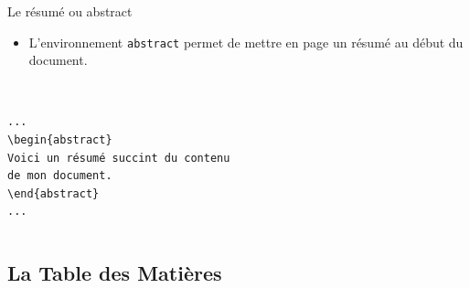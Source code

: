 \begin{frame}[fragile]{Le résumé ou abstract}
  \begin{itemize}
      \item L'environnement \lstinline|abstract| permet de mettre en page un résumé au début du document.
  \end{itemize}
  \begin{columns}
    \begin{column}{0.5\textwidth}
      \begin{lstlisting}[style=nonumbers]

...
\begin{abstract}
Voici un résumé succint du contenu
de mon document.
\end{abstract}
...

      \end{lstlisting}
    \end{column}
    \begin{column}{0.5\textwidth}
              \begin{abstract}
                  Voici un résumé succint du contenu de mon document.
              \end{abstract}
    \end{column}
  \end{columns}
\end{frame}

\subsection{La Table des Matières}

